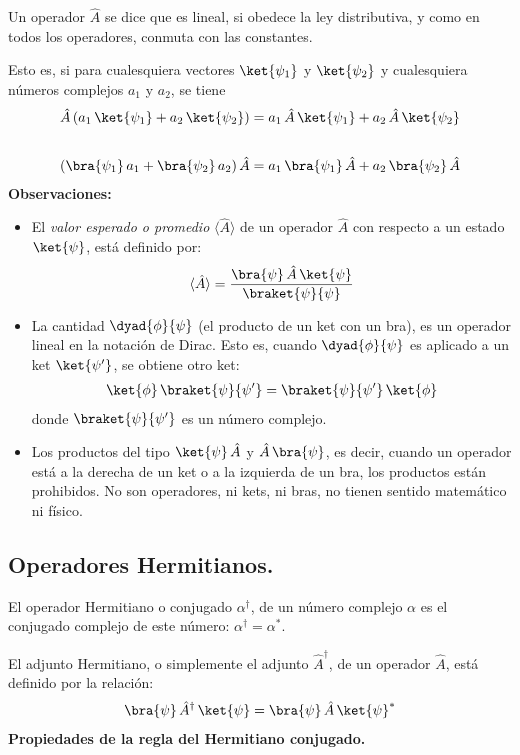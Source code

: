 Un operador $\hat{A}$ se dice que es lineal, si obedece la ley distributiva, y como en todos los operadores, conmuta con las constantes.
\par
Esto es, si para cualesquiera vectores $\ket{\psi_{1}}$ y $\ket{\psi_{2}}$ y cualesquiera números complejos $a_{1}$ y $a_{2}$, se tiene
\begin{align}
\hat{A} \, (a_{1} \, \ket{\psi_{1}} + a_{2} \, \ket{\psi_{2}}) &= a_{1} \, \hat{A} \, \ket{\psi_{1}} + a_{2} \, \hat{A} \, \ket{\psi_{2}} \label{eq:ecuacion_02_56} \\[1.75em]
( \bra{\psi_{1}} \, a_{1} +  \bra{\psi_{2}} \, a_{2}) \, \hat{A} &= a_{1} \, \bra{\psi_{1}} \, \hat{A} + a_{2} \, \bra{\psi_{2}} \, \hat{A} \label{eq:ecuacion_02_57}
\end{align}
\newpage
\textbf{Observaciones:}
\begin{itemize}
\item El \emph{valor esperado o promedio} $\langle{\hat{A}}\rangle$ de un operador $\hat{A}$ con respecto a un estado $\ket{\psi}$, está definido por:
\begin{align}
\langle{\hat{A}}\rangle = \dfrac{\bra{\psi} \, \hat{A} \, \ket{\psi}}{\braket{\psi}{\psi}}
\label{eq:ecuacion_02_58}
\end{align}
\item La cantidad $\dyad{\phi}{\psi}$ (el producto de un ket con un bra), es un operador lineal en la notación de Dirac. Esto es, cuando $\dyad{\phi}{\psi}$ es aplicado a un ket $\ket{\psi^{\prime}}$, se obtiene otro ket:
\begin{align}
\ket{\phi} \, \braket{\psi}{\psi^{\prime}} =  \braket{\psi}{\psi^{\prime}} \, \ket{\phi}
\label{eq:ecuacion_02_59}
\end{align}
donde $\braket{\psi}{\psi^{\prime}}$ es un número complejo.
\item Los productos del tipo $\ket{\psi} \, \hat{A}$ y $\hat{A} \, \bra{\psi}$, es decir, cuando un operador está a la derecha de un ket o a la izquierda de un bra, los productos están prohibidos. No son operadores, ni kets, ni bras, no tienen sentido matemático ni físico.
\end{itemize}

\subsection{Operadores Hermitianos.}

El operador Hermitiano o conjugado $\alpha^{\dagger}$, de un número complejo $\alpha$ es el conjugado complejo de este número: $\alpha^{\dagger} = \alpha^{*}$.
\par
El adjunto Hermitiano, o simplemente el adjunto $\hat{A}^{\dagger}$, de un operador $\hat{A}$, está definido por la relación:
\begin{align}
\bra{\psi} \, \hat{A}^{\dagger} \, \ket{\psi} = \bra{\psi} \, \hat{A} \, \ket{\psi}^{*}
\label{eq:ecuacion_02_60}
\end{align}
\textbf{Propiedades de la regla del Hermitiano conjugado.}

